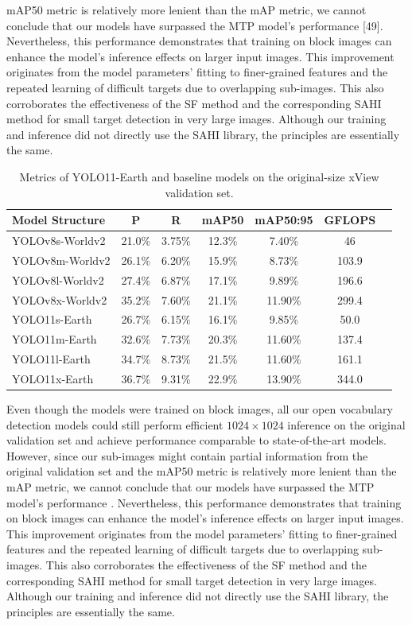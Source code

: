 \documentclass{article}
\begin{document}
mAP50 metric is relatively more lenient than the mAP metric, we cannot conclude that our models have surpassed the 
MTP model's performance [49]. Nevertheless, this performance demonstrates that training on block images can 
enhance the model's inference effects on larger input images. This improvement originates from the model 
parameters' fitting to finer-grained features and the repeated learning of difficult targets due to overlapping 
sub-images. This also corroborates the effectiveness of the SF method and the corresponding SAHI method for small 
target detection in very large images. Although our training and inference did not directly use the SAHI library, 
the principles are essentially the same.
\begin{table}[ht]
\centering
\caption{Metrics of YOLO11-Earth and baseline models on the original-size xView validation set.}
\begin{tabular}{lcccccc}
\toprule
\textbf{Model Structure} & \textbf{P} & \textbf{R} & \textbf{mAP50} & \textbf{mAP50:95} & \textbf{GFLOPS} \\
\midrule
YOLOv8s-Worldv2 & 21.0\% & 3.75\% & 12.3\% & 7.40\% & 46 \\
YOLOv8m-Worldv2 & 26.1\% & 6.20\% & 15.9\% & 8.73\% & 103.9 \\
YOLOv8l-Worldv2 & 27.4\% & 6.87\% & 17.1\% & 9.89\% & 196.6 \\
YOLOv8x-Worldv2 & 35.2\% & 7.60\% & 21.1\% & 11.90\% & 299.4 \\
\midrule
YOLO11s-Earth & 26.7\% & 6.15\% & 16.1\% & 9.85\% & 50.0 \\
YOLO11m-Earth & 32.6\% & 7.73\% & 20.3\% & 11.60\% & 137.4 \\
YOLO11l-Earth & 34.7\% & 8.73\% & 21.5\% & 11.60\% & 161.1 \\
YOLO11x-Earth & 36.7\% & 9.31\% & 22.9\% & 13.90\% & 344.0 \\
\bottomrule
\end{tabular}
\end{table}
Even though the models were trained on block images, all our open vocabulary detection models could still perform 
efficient $1024 \times 1024$ inference on the original validation set and achieve performance comparable to 
state-of-the-art models. However, since our sub-images might contain partial information from the original 
validation set and the mAP50 metric is relatively more lenient than the mAP metric, we cannot conclude that 
our models have surpassed the MTP model's performance \cite{wang2024mtp}. Nevertheless, this performance demonstrates that 
training on block images can enhance the model's inference effects on larger input images. This improvement 
originates from the model parameters' fitting to finer-grained features and the repeated learning of difficult 
targets due to overlapping sub-images. This also corroborates the effectiveness of the SF method and the 
corresponding SAHI method for small target detection in very large images. Although our training and inference 
did not directly use the SAHI library, the principles are essentially the same.
\end{document}
